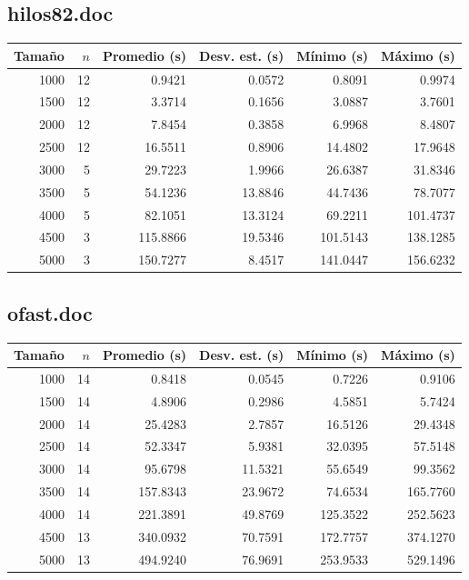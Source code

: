 \documentclass[conference]{IEEEtran}
\begin{document}
\subsection{hilos82.doc}
\begin{center}
\begin{tabular}{rrrrrr}
\toprule
Tamaño & $n$ & Promedio (s) & Desv. est. (s) & Mínimo (s) & Máximo (s) \\
\midrule
1000 & 12 & 0.9421 & 0.0572 & 0.8091 & 0.9974 \\
1500 & 12 & 3.3714 & 0.1656 & 3.0887 & 3.7601 \\
2000 & 12 & 7.8454 & 0.3858 & 6.9968 & 8.4807 \\
2500 & 12 & 16.5511 & 0.8906 & 14.4802 & 17.9648 \\
3000 & 5 & 29.7223 & 1.9966 & 26.6387 & 31.8346 \\
3500 & 5 & 54.1236 & 13.8846 & 44.7436 & 78.7077 \\
4000 & 5 & 82.1051 & 13.3124 & 69.2211 & 101.4737 \\
4500 & 3 & 115.8866 & 19.5346 & 101.5143 & 138.1285 \\
5000 & 3 & 150.7277 & 8.4517 & 141.0447 & 156.6232 \\
\bottomrule
\end{tabular}
\end{center}
\subsection{ofast.doc}
\begin{center}
\begin{tabular}{rrrrrr}
\toprule
Tamaño & $n$ & Promedio (s) & Desv. est. (s) & Mínimo (s) & Máximo (s) \\
\midrule
1000 & 14 & 0.8418 & 0.0545 & 0.7226 & 0.9106 \\
1500 & 14 & 4.8906 & 0.2986 & 4.5851 & 5.7424 \\
2000 & 14 & 25.4283 & 2.7857 & 16.5126 & 29.4348 \\
2500 & 14 & 52.3347 & 5.9381 & 32.0395 & 57.5148 \\
3000 & 14 & 95.6798 & 11.5321 & 55.6549 & 99.3562 \\
3500 & 14 & 157.8343 & 23.9672 & 74.6534 & 165.7760 \\
4000 & 14 & 221.3891 & 49.8769 & 125.3522 & 252.5623 \\
4500 & 13 & 340.0932 & 70.7591 & 172.7757 & 374.1270 \\
5000 & 13 & 494.9240 & 76.9691 & 253.9533 & 529.1496 \\
\bottomrule
\end{tabular}
\end{center}
\end{document}
